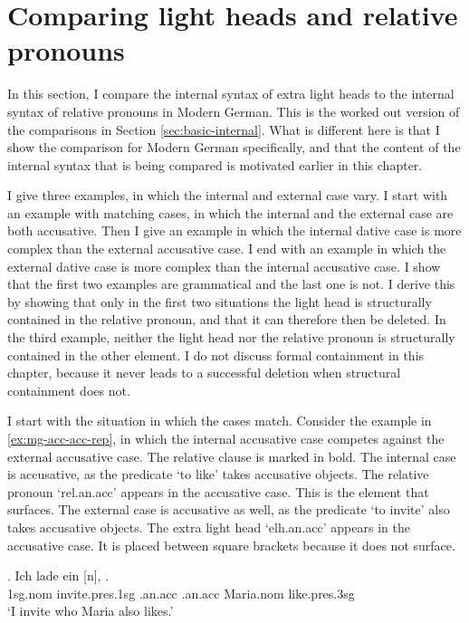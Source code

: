 \section{Comparing light heads and relative pronouns}\label{sec:comparing-mg}

In this section, I compare the internal syntax of extra light heads to the internal syntax of relative pronouns in Modern German. This is the worked out version of the comparisons in Section \ref{sec:basic-internal}. What is different here is that I show the comparison for Modern German specifically, and that the content of the internal syntax that is being compared is motivated earlier in this chapter.

I give three examples, in which the internal and external case vary.
I start with an example with matching cases, in which the internal and the external case are both accusative.
Then I give an example in which the internal dative case is more complex than the external accusative case.
I end with an example in which the external dative case is more complex than the internal accusative case.
I show that the first two examples are grammatical and the last one is not. I derive this by showing that only in the first two situations the light head is structurally contained in the relative pronoun, and that it can therefore then be deleted.
In the third example, neither the light head nor the relative pronoun is structurally contained in the other element.
I do not discuss formal containment in this chapter, because it never leads to a successful deletion when structural containment does not.

I start with the situation in which the cases match.
Consider the example in \ref{ex:mg-acc-acc-rep}, in which the internal accusative case competes against the external accusative case. The relative clause is marked in bold.
The internal case is accusative, as the predicate  `to like' takes accusative objects. The relative pronoun  `\ac{rel}.\ac{an}.\ac{acc}' appears in the accusative case. This is the element that surfaces.
The external case is accusative as well, as the predicate  `to invite' also takes accusative objects. The extra light head  `\ac{elh}.\ac{an}.\ac{acc}' appears in the accusative case. It is placed between square brackets because it does not surface.

\exg. Ich {lade ein} [n],    .\\
 1\ac{sg}.\ac{nom} invite.\ac{pres}.1\ac{sg}\scsub{[acc]} .\ac{an}.\ac{acc} .\ac{an}.\ac{acc} Maria.\ac{nom} like.\ac{pres}.3\ac{sg}\scsub{[acc]}\\
 `I invite who Maria also likes.' \label{ex:mg-acc-acc-rep}

